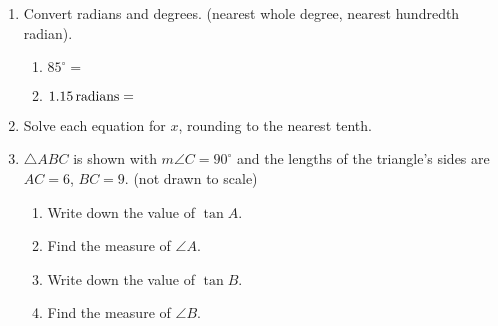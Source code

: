 \begin{enumerate}
\item Convert radians and degrees. (nearest whole degree, nearest hundredth radian).\vspace{.25cm}
  \begin{multicols}{2}
    \begin{enumerate}
      \item $85^\circ = $ \vspace{1cm}
      \item $\displaystyle 1.15 \,\rm{radians}=$ \vspace{1cm}
    \end{enumerate}
  \end{multicols} \vspace{2cm}


\item Solve each equation for $x$, rounding to the nearest tenth.
  \begin{enumerate}
  \end{enumerate}
  \vspace{3cm}

\newpage
\item $\triangle ABC$ is shown with $m\angle C=90^\circ$ and the lengths of the triangle's sides are $AC=6$, $BC=9$.  \hfill (not drawn to scale)
  \begin{multicols}{2}
    \begin{enumerate}
      \item Write down the value of $\tan A$. \vspace{1.25cm}
      \item Find the measure of $\angle A$. \vspace{1cm}
      \item Write down the value of $\tan B$. \vspace{1.25cm}
      \item Find the measure of $\angle B$. \vspace{1cm}
    \end{enumerate}
    \begin{flushright}
    \end{flushright}
  \end{multicols}
  \vspace{2cm}
  


\end{enumerate}
